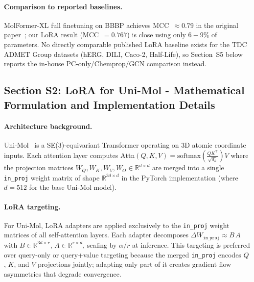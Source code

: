 \documentclass[9pt,a4paper]{article}
\begin{document}
\paragraph{Comparison to reported baselines.}
MolFormer-XL full finetuning on BBBP achieves MCC~$\approx 0.79$ in the original paper~\cite{ross2022molformer}; our LoRA result (MCC~$= 0.767$) is close using
only $6-9\%$ of parameters.
No directly comparable published LoRA baseline exists for the TDC ADMET Group datasets
(hERG, DILI, Caco-2, Half-Life), so Section~S5 below reports the in-house
PC-only/Chemprop/GCN comparison instead.

\subsection*{Section S2: LoRA for Uni-Mol - Mathematical Formulation and
Implementation Details}

\paragraph{Architecture background.}
Uni-Mol~\cite{zhou2023unimol} is a SE(3)-equivariant Transformer operating on
3D atomic coordinate inputs.
Each attention layer computes
$\text{Attn}(Q, K, V) = \text{softmax}\!\left(\tfrac{QK^\top}{\sqrt{d_k}}\right)V$
where the projection matrices $W_Q, W_K, W_V, W_O \in \mathbb{R}^{d \times d}$
are merged into a single \texttt{in\_proj} weight matrix of shape
$\mathbb{R}^{3d \times d}$ in the PyTorch implementation
(where $d = 512$ for the base Uni-Mol model).

\paragraph{LoRA targeting.}
For Uni-Mol, LoRA adapters are applied exclusively to the \texttt{in\_proj} weight
matrices of all self-attention layers.
Each adapter decomposes $\Delta W_{\texttt{in\_proj}} \approx B\,A$ with
$B \in \mathbb{R}^{3d \times r}$, $A \in \mathbb{R}^{r \times d}$, scaling by
$\alpha / r$ at inference.
This targeting is preferred over query-only or query+value targeting because
the merged \texttt{in\_proj} encodes $Q$, $K$, and $V$ projections jointly;
adapting only part of it creates gradient flow asymmetries that degrade convergence.
\end{document}
